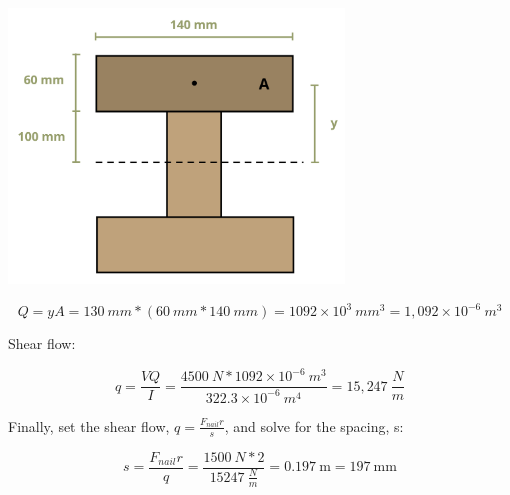 \documentclass[
  letterpaper,
  DIV=11,
  numbers=noendperiod]{scrreprt}
\theoremstyle{definition}
\theoremstyle{remark}
\begin{document}
\begin{tcolorbox}
\begin{tcolorbox}
\begin{center}
\includegraphics[width=3.51042in,height=\textheight]{images/CH10 PNGs/example 10.5 part 4.png}
\end{center}

\[
Q=y A=130{~mm} *(60{~mm} * 140{~mm})=1092 \times 10^3{~mm}^3=1,092 \times 10^{-6}{~m}^3
\]

Shear flow:

\[
q=\frac{V Q}{I}=\frac{4500 {~N}* 1092 \times 10^{-6}{~m}^3}{322.3 \times 10^{-6}{~m}^4}=15,247~\frac{N}{m}
\]

Finally, set the shear flow, \(q=\frac{F_{nail} r}{s}\), and solve for
the spacing, s:

\[
s=\frac{F_{nail} r}{q}=\frac{1500{~N} * 2}{15247~\frac{N}{m}}=0.197 \mathrm{~m}=197 \mathrm{~mm}
\]

\end{tcolorbox}

\end{tcolorbox}
\end{document}
